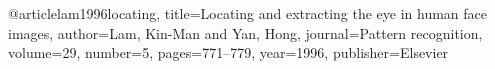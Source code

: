@article{lam1996locating,
  title={Locating and extracting the eye in human face images},
  author={Lam, Kin-Man and Yan, Hong},
  journal={Pattern recognition},
  volume={29},
  number={5},
  pages={771--779},
  year={1996},
  publisher={Elsevier}
}
